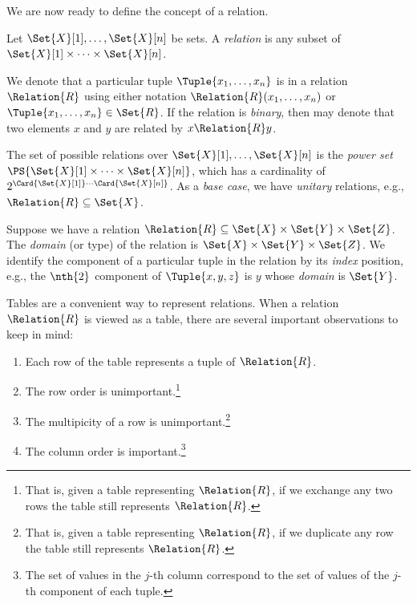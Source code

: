 \documentclass[ ../main.tex]{subfiles}
\begin{document}
We are now ready to define the concept of a relation.
\begin{definition}[Relation]
Let $\Set{X}[1],\ldots,\Set{X}[n]$ be sets. A \emph{relation} is any subset of $\Set{X}[1] \times \cdots \times \Set{X}[n]$.
\end{definition}
We denote that a particular tuple $\Tuple{x_1,\ldots,x_n}$ is in a relation $\Relation{R}$ using either notation $\Relation{R}(x_1,\ldots,x_n)$ or $\Tuple{x_1,\ldots,x_n} \in \Set{R}$. If the relation is \emph{binary}, then may denote that two elements $x$ and $y$ are related by $x \Relation{R} y$.

The set of possible relations over $\Set{X}[1],\ldots,\Set{X}[n]$ is the \emph{power set} $\PS{\Set{X}[1] \times \cdots \times \Set{X}[n]}$, which has a cardinality of $2^{\Card{\Set{X}[1]} \cdots \Card{\Set{X}[n]}}$. As a \emph{base case}, we have \emph{unitary} relations, e.g., $\Relation{R} \subseteq \Set{X}$.

Suppose we have a relation $\Relation{R} \subseteq \Set{X} \times \Set{Y} \times \Set{Z}$.
The \emph{domain} (or type) of the relation is $\Set{X} \times \Set{Y} \times \Set{Z}$.
We identify the component of a particular tuple in the relation by its \emph{index} position, e.g., the $\nth{2}$ component of $\Tuple{x,y,z}$ is $y$ whose \emph{domain} is $\Set{Y}$.

Tables are a convenient way to represent relations. When a relation $\Relation{R}$ is viewed as a table, there are several important observations to keep in mind:
\begin{enumerate}
\item Each row of the table represents a tuple of $\Relation{R}$.
\item The row order is unimportant.\footnote{That is, given a table representing $\Relation{R}$, if we exchange any two rows the table still represents $\Relation{R}$.}
\item The multipicity of a row is unimportant.\footnote{That is, given a table representing $\Relation{R}$, if we duplicate any row the table still represents $\Relation{R}$.}
\item The column order is important.\footnote{The set of values in the $j$-th column correspond to the set of values of the $j$-th component of each tuple.}
\end{enumerate}
\end{document}
